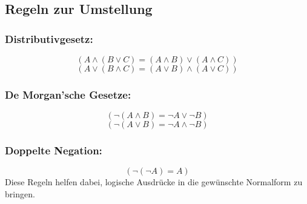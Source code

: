 \documentclass{article}
\begin{document}
\subsection*{Regeln zur Umstellung}
\subsubsection*{Distributivgesetz:}
\[
( A \land (B \lor C) = (A \land B) \lor (A \land C) )
\]
\[
( A \lor (B \land C) = (A \lor B) \land (A \lor C) )
\]
\subsubsection*{De Morgan'sche Gesetze:}
\[
( \neg (A \land B) = \neg A \lor \neg B )
\]
\[
( \neg (A \lor B) = \neg A \land \neg B )
\]
\subsubsection*{Doppelte Negation:}
\[
( \neg (\neg A) = A )
\]
Diese Regeln helfen dabei, logische Ausdrücke in die gewünschte Normalform zu bringen.
\end{document}
